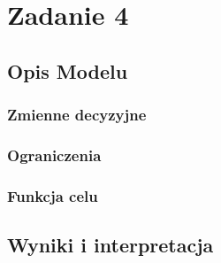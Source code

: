 \documentclass{article}
\begin{document}
\section{Zadanie 4}
\subsection{Opis Modelu}

\subsubsection{Zmienne decyzyjne}

\subsubsection{Ograniczenia}

\subsubsection{Funkcja celu}

\subsection{Wyniki i interpretacja}
\end{document}
